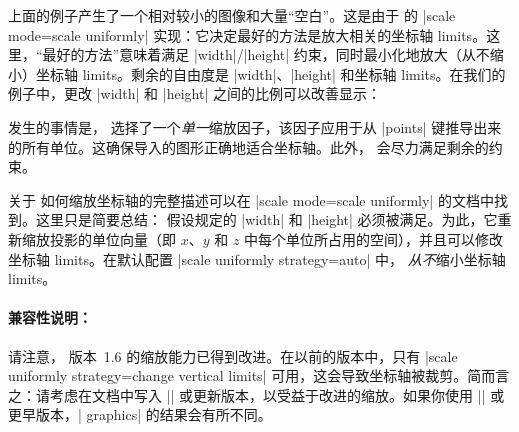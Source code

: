 {{上面的例子产生了一个相对较小的图像和大量“空白”。这是由于 \PGFPlots{} 的 |scale mode=scale uniformly| 实现：它决定最好的方法是放大相关的坐标轴 limits。这里，“最好的方法”意味着满足 |width|/|height| 约束，同时最小化地放大（从不缩小）坐标轴 limits。剩余的自由度是 |width|、|height| 和坐标轴 limits。在我们的例子中，更改 |width| 和 |height| 之间的比例可以改善显示：

\begin{codeexample}[]
\end{codeexample}
%
\noindent 发生的事情是，\PGFPlots{} 选择了一个\emph{单一}缩放因子，该因子应用于从 |points| 键推导出来的所有单位。这确保导入的图形正确地适合坐标轴。此外，\PGFPlots{} 会尽力满足剩余的约束。

关于 \PGFPlots{} 如何缩放坐标轴的完整描述可以在 |scale mode=scale uniformly| 的文档中找到。这里只是简要总结：\PGFPlots{} 假设规定的 |width| 和 |height| 必须被满足。为此，它重新缩放投影的单位向量（即 $x$、$y$ 和 $z$ 中每个单位所占用的空间），并且可以修改坐标轴 limits。在默认配置 |scale uniformly strategy=auto| 中，\PGFPlots{} \emph{从不}缩小坐标轴 limits。


\paragraph{兼容性说明：}

请注意，\PGFPlots{} 版本~1.6 的缩放能力已得到改进。在以前的版本中，只有 |scale uniformly strategy=change vertical limits| 可用，这会导致坐标轴被裁剪。简而言之：请考虑在文档中写入 |\pgfplotsset{compat=1.6}| 或更新版本，以受益于改进的缩放。如果你使用 |\pgfplotsset{compat=1.5}| 或更早版本，| graphics| 的结果会有所不同。

}}
